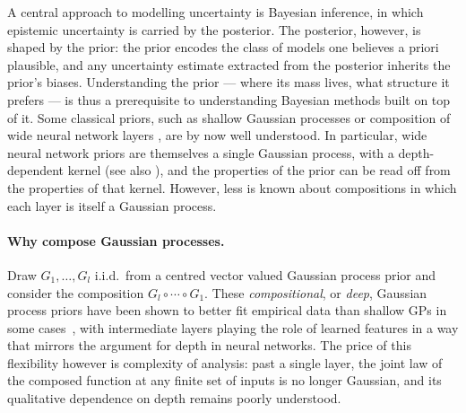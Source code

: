 \documentclass{article}
\begin{document}
A central approach to modelling uncertainty is Bayesian inference, in which epistemic uncertainty is carried by the posterior. The posterior, however, is shaped by the prior: the prior encodes the class of models one believes a priori plausible, and any uncertainty estimate extracted from the posterior inherits the prior's biases. Understanding the prior --- where its mass lives, what structure it prefers --- is thus a prerequisite to understanding Bayesian methods built on top of it. Some classical priors, such as shallow Gaussian processes \citep{rasmussen2006gaussian} or composition of wide neural network layers \citep{neal1996bayesian,poole2016exponential,schoenholz2017deep,hayou2019impact}, are by now well understood. In particular, wide neural network priors are themselves a single Gaussian process, with a depth-dependent kernel \citep{lee2018deep,matthews2018gaussian} (see also ), 
and the properties of the prior can be read off from the properties of that kernel. However, less is known about compositions in which each layer is itself a Gaussian process.

\paragraph{Why compose Gaussian processes.}
Draw $G_1, \ldots, G_l$ i.i.d.\ from a centred vector valued Gaussian process prior and consider the composition $G_l \circ \cdots \circ G_1$. These \emph{compositional}, or \emph{deep}, Gaussian process priors \citep{damianou2013deep} have been shown to better fit empirical data than shallow GPs in some cases~\citep{damianou2013deep,lu2019interpretable}, with intermediate layers playing the role of learned features in a way that mirrors the argument for depth in neural networks. The price of this flexibility however is complexity of analysis: past a single layer, the joint law of the composed function at any finite set of inputs is no longer Gaussian, and its qualitative dependence on depth remains poorly understood.
\end{document}
